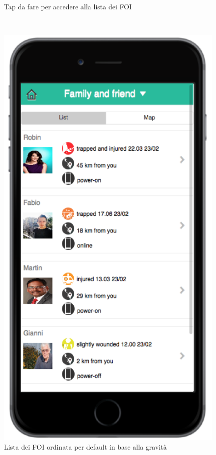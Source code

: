 \begin{figure}
\begin{minipage}[b]{6cm}
	\caption{Tap da fare per accedere alla lista dei FOI }
	\label{fig:tapfoi}
 \end{minipage}
 \ \hspace{6 mm} \hspace{7 mm} \
 \begin{minipage}[b]{6cm}
\centering
	\includegraphics[scale=0.9]{interfaccia/listafoi.png}
	\caption{Lista dei FOI ordinata per default in base alla gravità }
	\label{fig:lista-foi}
 \end{minipage}
\end{figure}


